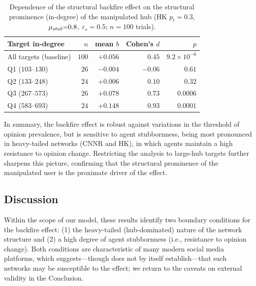 \documentclass[pdflatex,sn-mathphys-num]{sn-jnl}%
\theoremstyle{thmstyleone}%
\theoremstyle{thmstyletwo}%
\theoremstyle{thmstylethree}%
\def\orange#1{#1}%
\def\Black{\color[rgb]{0,0,0}}
\def\Stubbornness{\mu_{\it stub}}
\def\ThofOpPreval{\varepsilon_s}
\begin{document}
\begin{table}[t]
  \tabcolsep=6pt
  \centering
  \caption{Dependence of the structural backfire effect on the structural
  prominence (in-degree) of the manipulated hub (HK $p_t{=}0.3$,
  $\Stubbornness{=}0.8$, $\ThofOpPreval{=}0.5$; $n{=}100$ trials). }
  \label{tab:doseresponse}
  \begin{tabular}{lrrrr}
    \toprule
    \orange{Target in-degree} & \orange{$n$} & \orange{mean $b$} & \orange{Cohen's $d$} & \orange{$p$} \\
    \midrule
    \orange{All targets (baseline)} & \orange{$100$} & \orange{$+0.056$} & \orange{$0.45$}  & \orange{$9.2\times10^{-6}$} \\
    \midrule
    \orange{Q1 ($103$--$130$)}      & \orange{$26$}  & \orange{$-0.004$} & \orange{$-0.06$} & \orange{$0.61$} \\
    \orange{Q2 ($133$--$248$)}      & \orange{$24$}  & \orange{$+0.006$} & \orange{$0.10$}  & \orange{$0.32$} \\
    \orange{Q3 ($267$--$573$)}      & \orange{$26$}  & \orange{$+0.078$} & \orange{$0.73$}  & \orange{$0.0006$} \\
    \orange{Q4 ($583$--$693$)}      & \orange{$24$}  & \orange{$+0.148$} & \orange{$0.93$}  & \orange{$0.0001$} \\
    \bottomrule
  \end{tabular}
\end{table}

In summary, the backfire effect is robust against variations
in the threshold of opinion prevalence, but is sensitive to 
agent stubbornness, being most pronounced in heavy-tailed 
networks (CNNR and HK), in which agents maintain a 
high resistance to opinion change. Restricting the analysis 
to large-hub targets further sharpens this picture, 
confirming that the structural prominence of the 
manipulated user is the proximate driver of the effect.
\Black
\par


\subsection{Discussion}
Within the scope of our model, these results identify two
boundary conditions for the backfire effect:
(1) the heavy-tailed (hub-dominated) nature of
the network structure and (2) a high degree of agent stubbornness
(i.e., resistance to opinion change).
Both conditions are characteristic of many modern social media
platforms, which suggests---though does not by itself establish---that
such networks may be susceptible to the effect; we return to the
caveats on external validity in the Conclusion.
\par
\end{document}
